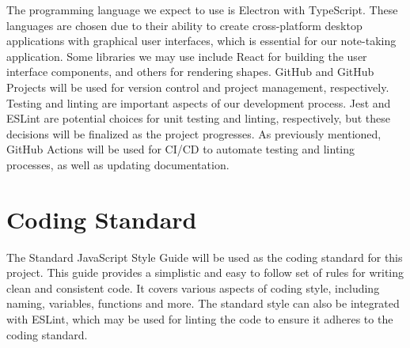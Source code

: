 \documentclass{article}
\begin{document}


The programming language we expect to use is Electron with TypeScript. 
These languages are chosen due to their ability to create cross-platform 
desktop applications with graphical user interfaces, which is essential 
for our note-taking application. Some libraries we may use include React 
for building the user interface components, and others for rendering shapes.
 GitHub and GitHub Projects will be used for version control and 
project management, respectively. Testing and linting are important aspects
 of our development process. Jest and ESLint are potential choices 
for unit testing and linting, respectively, but these decisions will be 
finalized as the project progresses. As previously mentioned, GitHub 
Actions will be used for CI/CD to automate testing and linting processes,
 as well as updating documentation.

\section{Coding Standard}


The Standard JavaScript Style Guide will be used as the coding standard for
 this project. This guide provides a simplistic and easy to follow
set of rules for writing clean and consistent code. It covers various aspects
 of coding style, including naming, variables, functions and more.
The standard style can also be integrated with ESLint, which may be used for
 linting the code to ensure it adheres to the coding standard.
\end{document}
